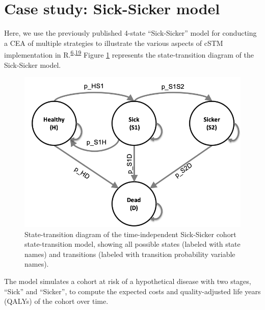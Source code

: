 \documentclass[
]{article}
\begin{document}
\hypertarget{case-study-sick-sicker-model}{%
\section{Case study: Sick-Sicker model}\label{case-study-sick-sicker-model}}

Here, we use the previously published 4-state ``Sick-Sicker'' model for conducting a CEA of multiple strategies to illustrate the various aspects of cSTM implementation in R.\textsuperscript{\protect\hyperlink{ref-Krijkamp2018}{6},\protect\hyperlink{ref-Enns2015e}{19}} Figure \ref{fig:STD-Sick-Sicker} represents the state-transition diagram of the Sick-Sicker model.

\begin{figure}[H]

{\centering \includegraphics[width=10.64in]{figs/Sick-Sicker} 

}

\caption{State-transition diagram of the time-independent Sick-Sicker cohort state-transition model, showing all possible states (labeled with state names) and transitions (labeled with transition probability variable names).}\label{fig:STD-Sick-Sicker}
\end{figure}

The model simulates a cohort at risk of a hypothetical disease with two stages, ``Sick'' and ``Sicker'', to compute the expected costs and quality-adjusted life years (QALYs) of the cohort over time.
\end{document}
